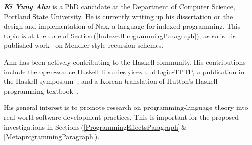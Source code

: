 \documentclass[11pt,twocolumn]{article}
\newcommand{\pref}[1]{\,(\ref{#1})}
\begin{document}
\smallskip\noindent
\textbf{\em Ki Yung Ahn} 
%
%
is a PhD candidate at the Department of Computer Science, Portland State
University. 
%
He is currently writing up his dissertation on the design and implementation
of Nax, a language for indexed programming.  This topic is at the core of
Section\pref{IndexedProgrammingParagraph}; as so is his published
work~\cite{AhnSheard11} 
on Mendler-style recursion schemes.

Ahn has been actively contributing to the Haskell community.  His
contributions include the open-source Haskell libraries yices and
logic-TPTP, a publication in the Haskell symposium~\cite{AhnSheard08}, and
a Korean translation of Hutton's Haskell programming
textbook~\cite{Hutton07}.

His general interest is to promote research on programming-language theory
into real-world software development practices.  This is important for the
proposed investigations in
Sections\,(\ref{ProgrammingEffectsParagraph}\,\&\,\ref{MetaprogrammingParagraph}).
\end{document}
